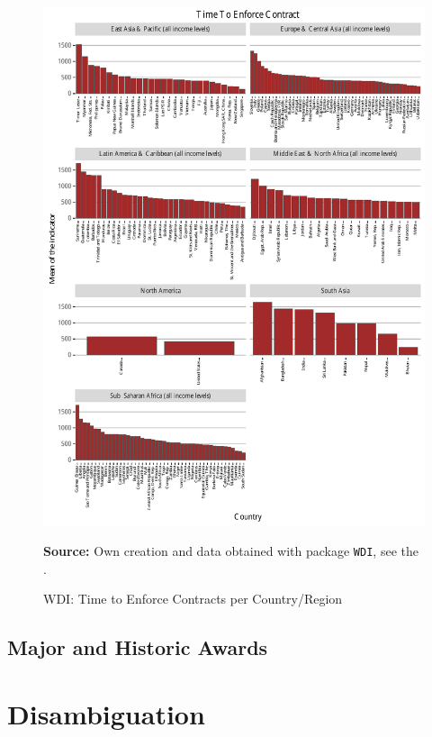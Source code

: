 \begin{figure}[H]
\begin{center}
\caption{WDI: Time to Enforce Contracts per Country/Region}
\label{fig_wdi_time_contract}
\includegraphics[max height=.9\textheight]{../img/wdi_time_to_enforce_contract.pdf}
\end{center}
\noindent \footnotesize{\textbf{Source:} Own creation and data obtained with package \texttt{WDI}, see the \cite{wb_r}.}
\end{figure}


\subsection{Major and Historic Awards}



\section{Disambiguation}